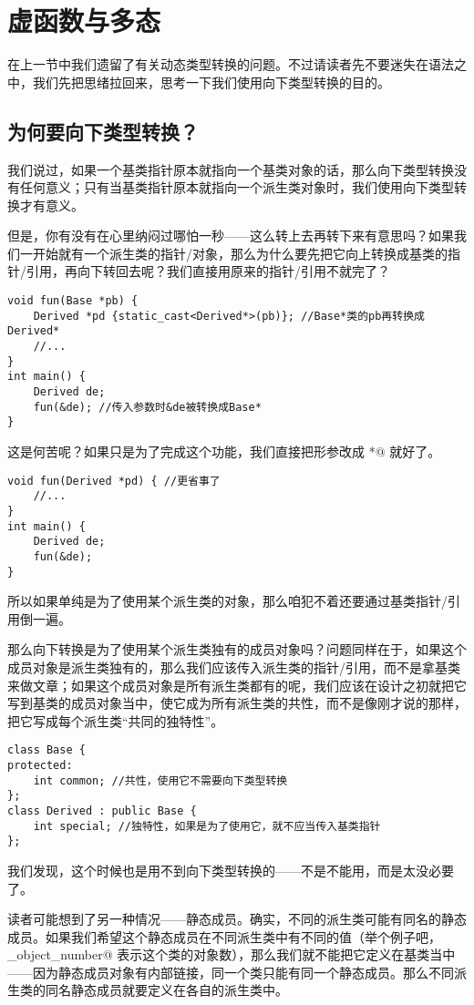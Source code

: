 \section{虚函数与多态}
在上一节中我们遗留了有关动态类型转换的问题。不过请读者先不要迷失在语法之中，我们先把思绪拉回来，思考一下我们使用向下类型转换的目的。\par
\subsection*{为何要向下类型转换？}
我们说过，如果一个基类指针原本就指向一个基类对象的话，那么向下类型转换没有任何意义；只有当基类指针原本就指向一个派生类对象时，我们使用向下类型转换才有意义。\par
但是，你有没有在心里纳闷过哪怕一秒——这么转上去再转下来有意思吗？如果我们一开始就有一个派生类的指针/对象，那么为什么要先把它向上转换成基类的指针/引用，再向下转回去呢？我们直接用原来的指针/引用不就完了？
\begin{lstlisting}
void fun(Base *pb) {
    Derived *pd {static_cast<Derived*>(pb)}; //Base*类的pb再转换成Derived*
    //...
}
int main() {
    Derived de;
    fun(&de); //传入参数时&de被转换成Base*
}
\end{lstlisting}
这是何苦呢？如果只是为了完成这个功能，我们直接把形参改成 \lstinline@Derived*@ 就好了。
\begin{lstlisting}
void fun(Derived *pd) { //更省事了
    //...
}
int main() {
    Derived de;
    fun(&de);
}
\end{lstlisting}
所以如果单纯是为了使用某个派生类的对象，那么咱犯不着还要通过基类指针/引用倒一遍。\par
那么向下转换是为了使用某个派生类独有的成员对象吗？问题同样在于，如果这个成员对象是派生类独有的，那么我们应该传入派生类的指针/引用，而不是拿基类来做文章；如果这个成员对象是所有派生类都有的呢，我们应该在设计之初就把它写到基类的成员对象当中，使它成为所有派生类的共性，而不是像刚才说的那样，把它写成每个派生类``共同的独特性''。\pagebreak
\begin{lstlisting}
class Base {
protected:
    int common; //共性，使用它不需要向下类型转换
};
class Derived : public Base {
    int special; //独特性，如果是为了使用它，就不应当传入基类指针
};
\end{lstlisting}
我们发现，这个时候也是用不到向下类型转换的——不是不能用，而是太没必要了。\par
读者可能想到了另一种情况——静态成员。确实，不同的派生类可能有同名的静态成员。如果我们希望这个静态成员在不同派生类中有不同的值（举个例子吧，\lstinline@_object_number@ 表示这个类的对象数），那么我们就不能把它定义在基类当中——因为静态成员对象有内部链接，同一个类只能有同一个静态成员。那么不同派生类的同名静态成员就要定义在各自的派生类中。
